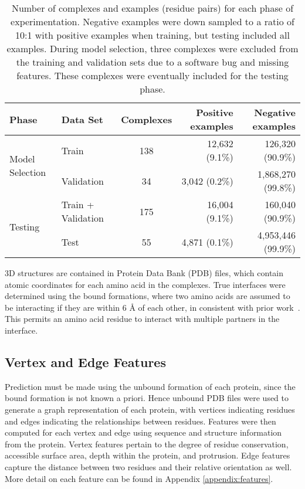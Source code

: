 \begin{table}
	\centering
	\begin{tabular}{l l c r r}
		\toprule
		Phase & Data Set & Complexes & Positive examples  & Negative examples \\ 
		\midrule
		\multirow{2}{*}{Model Selection} 
			& Train      & 138       & 12,632 (9.1\%)     & 126,320 (90.9\%) \\
			& Validation & 34        & 3,042 (0.2\%) 		& 1,868,270 (99.8\%) \\
		\midrule
		\multirow{2}{*}{Testing}
			& Train + Validation & 175 & 16,004 (9.1\%) & 160,040 (90.9\%) \\
			& Test       & 55        & 4,871 (0.1\%)      & 4,953,446 (99.9\%) \\ 
		\bottomrule
	\end{tabular}
	\caption{\small Number of complexes and examples (residue pairs) for each phase of experimentation. Negative examples were down sampled to a ratio of 10:1 with positive examples when training, but testing included all examples. During model selection, three complexes were excluded from the training and validation sets due to a software bug and missing features. These complexes were eventually included for the testing phase. \label{tab:dataset_size}}
	\label{tab:examples}
\end{table}

3D structures are contained in Protein Data Bank (PDB) files, which contain atomic coordinates for each amino acid in the complexes.
True interfaces were determined using the bound formations, where two amino acids are assumed to be interacting if they are within 6 \AA{} of each other, in consistent with prior work~\cite{ofran2007, ahmad2011, minhas2014}.
This permits an amino acid residue to interact with multiple partners in the interface.

\subsection{Vertex and Edge Features}
Prediction must be made using the unbound formation of each protein, since the bound formation is not known a priori.
Hence unbound PDB files were used to generate a graph representation of each protein, with vertices indicating residues and edges indicating the relationships between residues.
Features were then computed for each vertex and edge using sequence and structure information from the protein.
Vertex features pertain to the degree of residue conservation, accessible surface area, depth within the protein, and protrusion.
Edge features capture the distance between two residues and their relative orientation as well.
More detail on each feature can be found in Appendix \ref{appendix:features}.

